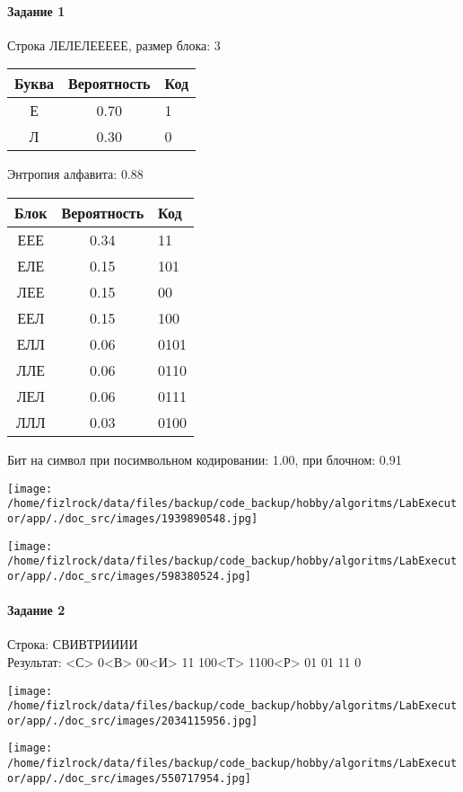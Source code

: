 \documentclass[a4paper, 12pt]{article}
\begin{document}
\paragraph{Задание 1}

Строка ЛЕЛЕЛЕЕЕЕЕ, размер блока: 3
\begin{center}
 \begin{tabular}{ |c|c|l| } 
  \hline
     Буква & Вероятность & Код\\ \hline
Е & 0.70 & 1\\\hline
Л & 0.30 & 0
\\ \hline \end{tabular}
\end{center}
Энтропия алфавита: 0.88
\begin{center}
 \begin{tabular}{ |c|c|l| } 
  \hline
     Блок & Вероятность & Код\\ \hline
ЕЕЕ & 0.34 & 11\\\hline
ЕЛЕ & 0.15 & 101\\\hline
ЛЕЕ & 0.15 & 00\\\hline
ЕЕЛ & 0.15 & 100\\\hline
ЕЛЛ & 0.06 & 0101\\\hline
ЛЛЕ & 0.06 & 0110\\\hline
ЛЕЛ & 0.06 & 0111\\\hline
ЛЛЛ & 0.03 & 0100
\\ \hline \end{tabular}
\end{center}
Бит на символ при посимвольном кодировании: 1.00, при блочном: 0.91

\texttt{[image: /home/fizlrock/data/files/backup/code\_backup/hobby/algoritms/LabExecutor/app/./doc\_src/images/1939890548.jpg]}

\texttt{[image: /home/fizlrock/data/files/backup/code\_backup/hobby/algoritms/LabExecutor/app/./doc\_src/images/598380524.jpg]}
\pagebreak
\paragraph{Задание 2}

Строка: 
СВИВТРИИИИ\\
Результат: <С> 0<В> 00<И> 11 100<Т> 1100<Р> 01 01 11 0

\texttt{[image: /home/fizlrock/data/files/backup/code\_backup/hobby/algoritms/LabExecutor/app/./doc\_src/images/2034115956.jpg]}

\texttt{[image: /home/fizlrock/data/files/backup/code\_backup/hobby/algoritms/LabExecutor/app/./doc\_src/images/550717954.jpg]}
\end{document}
